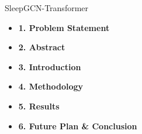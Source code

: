 \documentclass [aspectratio=169]{beamer}
\begin{document}









\begin{frame}{SleepGCN-Transformer}
	
	\begin{block}{}
		\begin{itemize}
			\item \textbf{1. Problem Statement}
			\item \textbf{2. Abstract}
			\item \textbf{3. Introduction}
			\item \textbf{4. Methodology}
			\item \textbf{5. Results}
			\item \textbf{6. Future Plan \& Conclusion}
		\end{itemize}
	\end{block}
\end{frame}


   
   



\end{document}
